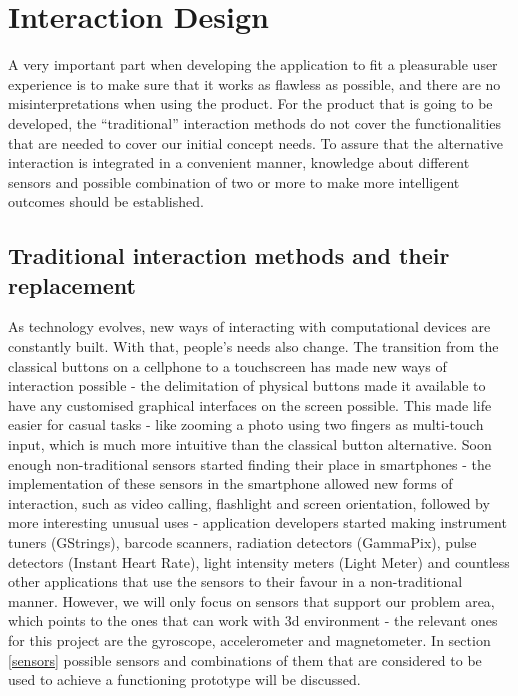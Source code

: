 \section{Interaction Design}
A very important part when developing the application to fit a pleasurable user experience is to make sure that it works as flawless as possible, and there are no misinterpretations when using the product. For the product that is going to be developed, the “traditional” interaction methods do not cover the functionalities that are needed to cover our initial concept needs. To assure that the alternative interaction is integrated in a convenient manner, knowledge about different sensors and possible combination of two or more to make more intelligent outcomes should be established.
\subsection{Traditional interaction methods and their replacement}
As technology evolves, new ways of interacting with computational devices are constantly built. With that, people’s needs also change. The transition from the classical buttons on a cellphone to a touchscreen has made new ways of interaction possible - the delimitation of physical buttons made it available to have any customised graphical interfaces on the screen possible. This made life easier for casual tasks - like zooming a photo using two fingers as multi-touch input, which is much more intuitive than the classical button alternative.
Soon enough non-traditional sensors started finding their place in smartphones - the implementation of these sensors in the smartphone allowed new forms of interaction, such as video calling, flashlight and screen orientation, followed by more interesting unusual uses - application developers started making instrument tuners (GStrings), barcode scanners, radiation detectors (GammaPix), pulse detectors (Instant Heart Rate), light intensity meters (Light Meter) and countless other applications that use the sensors to their favour in a non-traditional manner. However, we will only focus on sensors that support our problem area, which points to the ones that can work with 3d environment - the relevant ones for this project are the gyroscope, accelerometer and magnetometer. In section \ref{sensors} possible sensors and combinations of them that are considered to be used to achieve a functioning prototype will be discussed. %

